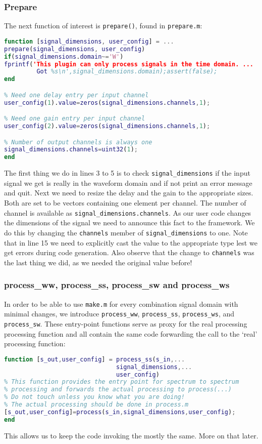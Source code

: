 \documentclass[11pt,a4paper,twoside]{article}
\newcommand{\+}{\discretionary{\mbox{\scriptsize$\hookleftarrow$}}{}{}}
\begin{document}
\subsubsection*{Prepare}
The next function of interest is \texttt{prepare()}, found in \texttt{prepare.m}:
\begin{lstlisting}[language=Matlab]
function [signal_dimensions, user_config] = ...
prepare(signal_dimensions, user_config)
if(signal_dimensions.domain~='W')
fprintf('This plugin can only process signals in the time domain. ...
         Got %s\n',signal_dimensions.domain);assert(false);
end

% Need one delay entry per input channel
user_config(1).value=zeros(signal_dimensions.channels,1);

% Need one gain entry per input channel
user_config(2).value=zeros(signal_dimensions.channels,1);

% Number of output channels is always one
signal_dimensions.channels=uint32(1);
end
\end{lstlisting}
The first thing we do in lines 3 to 5 is to check \texttt{signal\_dimensions} if the
input signal we get is really in the waveform domain and if not print an error
message and quit.
Next we need to resize the delay and the gain to the appropriate sizes. Both are
set to be vectors containing one element per channel. The number of channel is
available as \texttt{signal\_dimensions.channels}. As our user code changes the
dimensions of the signal we need to announce this fact to the \mha{} framework.
We do this by changing the \texttt{channels} member of \texttt{signal\_dimensions} to one.
Note that in line 15 we need to explicitly cast the value to the appropriate type lest we
get errors during code generation. Also observe that the change to \texttt{channels}
was the last thing we did, as we needed the original value before!
\subsubsection*{process\_ww, process\_ss, process\_sw and process\_ws}
In order to be able to use \texttt{make.m} for every combination signal domain
with minimal changes, we introduce \texttt{process\_ww}, \texttt{process\_ss},
\texttt{process\_ws}, and \texttt{process\_sw}. These entry-point functions serve
as proxy for the real processing processing function and all contain the same
code forwarding the call to the `real' processing function:
\begin{lstlisting}[language=Matlab]
function [s_out,user_config] = process_ss(s_in,...
                               signal_dimensions,...
                               user_config)
% This function provides the entry point for spectrum to spectrum
% processing and forwards the actual processing to process(...)
% Do not touch unless you know what you are doing! 
% The actual processing should be done in process.m
[s_out,user_config]=process(s_in,signal_dimensions,user_config);
end
\end{lstlisting}
This allows us to keep the code invoking the \Matlab{} mostly the same. More on
that later. 
\end{document}
